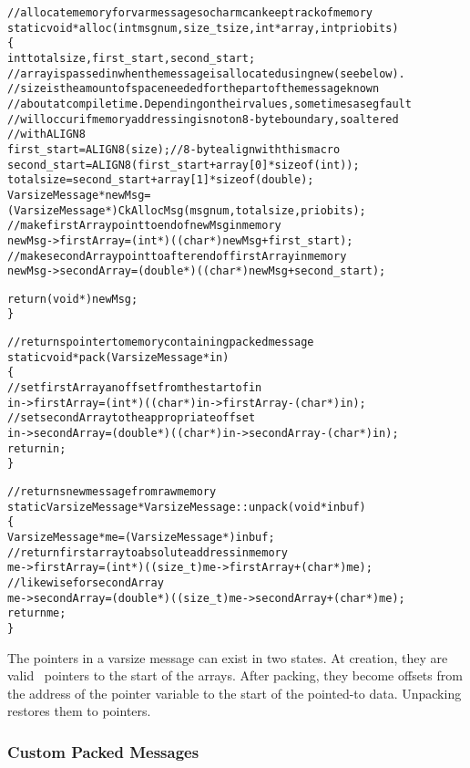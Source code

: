 \begin{alltt}
// allocate memory for varmessage so charm can keep track of memory
static void* alloc(int msgnum, size_t size, int* array, int priobits)
\{
  int totalsize, first_start, second_start;
  // array is passed in when the message is allocated using new (see below).
  // size is the amount of space needed for the part of the message known
  // about at compile time.  Depending on their values, sometimes a segfault
  // will occur if memory addressing is not on 8-byte boundary, so altered
  // with ALIGN8
  first_start = ALIGN8(size);  // 8-byte align with this macro
  second_start = ALIGN8(first_start + array[0]*sizeof(int));
  totalsize = second_start + array[1]*sizeof(double);
  VarsizeMessage* newMsg = 
    (VarsizeMessage*) CkAllocMsg(msgnum, totalsize, priobits);
  // make firstArray point to end of newMsg in memory
  newMsg->firstArray = (int*) ((char*)newMsg + first_start);
  // make secondArray point to after end of firstArray in memory
  newMsg->secondArray = (double*) ((char*)newMsg + second_start);

  return (void*) newMsg;
\}

// returns pointer to memory containing packed message
static void* pack(VarsizeMessage* in)
\{
  // set firstArray an offset from the start of in
  in->firstArray = (int*) ((char*)in->firstArray - (char*)in);
  // set secondArray to the appropriate offset
  in->secondArray = (double*) ((char*)in->secondArray - (char*)in);
  return in;
\}

// returns new message from raw memory
static VarsizeMessage* VarsizeMessage::unpack(void* inbuf)
\{
  VarsizeMessage* me = (VarsizeMessage*)inbuf;
  // return first array to absolute address in memory
  me->firstArray = (int*) ((size_t)me->firstArray + (char*)me);
  // likewise for secondArray
  me->secondArray = (double*) ((size_t)me->secondArray + (char*)me);
  return me;
\}
\end{alltt}

The pointers in a varsize message can exist in two states.  At creation, they
are valid \CC\ pointers to the start of the arrays.  After packing, they become
offsets from the address of the pointer variable to the start of the pointed-to
data.  Unpacking restores them to pointers. 

\subsubsection{Custom Packed Messages}
\label{sec:messages/packed_msgs}


